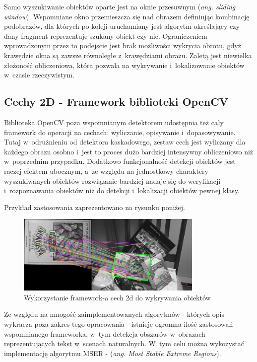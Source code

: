 Samo wyszukiwanie obiektów oparte jest na oknie przesuwnym
(\textit{ang. sliding window}). Wspomniane okno przemieszcza się nad
obrazem definiując kombinację podobrazów, dla których po koleji uruchamiany
jest algorytm określający czy dany fragment reprezentuje szukany obiekt czy
nie. Ograniczeniem wprowadzonym przez to podejscie jest brak możliwości
wykrycia obrotu, gdyż krawędzie okna są zawsze równoległe z~krawędziami
obrazu. Zaletą jest niewielka złożoność obliczeniowa, która pozwala
na wykrywanie i~lokalizowanie obiektów w~czasie rzeczywistym.

\subsection{Cechy 2D - Framework biblioteki OpenCV}

Biblioteka OpenCV poza wspomnianym detektorem udostępnia też cały
framework do operacji na cechach: wyliczanie, opisywanie i~dopasowywanie.
Tutaj w~odrużnieniu od detektora kaskadowego, zestaw cech
jest wyliczany dla każdego obrazu osobno i~jest to proces dużo bardziej
intensywny obliczeniowo niż w~poprzednim przypadku. Dodatkowo
funkcjonalność detekcji obiektów jest raczej efektem ubocznym,
a~ze względu na jednostkowy charaktery wyszukiwanych obiektów rozwiązanie
bardziej nadaje się do weryfikacji i~rozpoznawania obiektów niż do
detekcji i~lokalizacji obiektów pewnej klasy.

Przykład zastosowania zaprezentowano na rysunku poniżej.

\begin{figure}[h!]
  \centering
    \includegraphics[width=0.8\textwidth]{img/rev_features2d_detection}
  \caption{Wykorzystanie framework-a cech 2d do wykrywania obiektów}
\end{figure}

Ze względu na mnogość zaimplementowanych algorytmów - których opis
wykracza poza zakres tego opracowania - istnieje ogromna ilość
zastosowań wspomnianego frameworka, w~tym detekcja obszarów
w~obrazach reprezentujących tekst w~scenach naturalnych. W~tym celu
można wykożystać implementację algorytmu MSER - (\textit{ang. Most
Stable Extreme Regions}).

